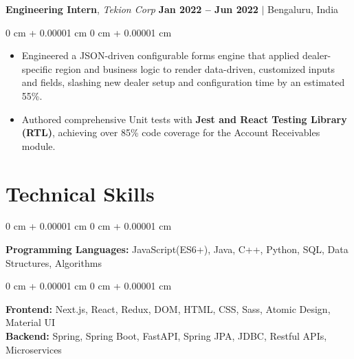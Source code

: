 \documentclass[10pt, letterpaper]{article}
\newenvironment{highlights}{
    \begin{itemize}[
        topsep=0.10 cm,     %
        parsep=0.10 cm,     %
        partopsep=0pt,      %
        itemsep=0.03cm,     %
        leftmargin=0 cm + 10pt  %
    ]
}{
    \end{itemize}
}
\newenvironment{onecolentry}{
    \begin{adjustwidth}{
        0 cm + 0.00001 cm
    }{
        0 cm + 0.00001 cm
    }
}{
    \end{adjustwidth}
}
\begin{document}
        \vspace{0.3 cm}

        \noindent
        \textbf{Engineering Intern}, {\color{darkgray}\textit{Tekion Corp}} \hfill {\color{darkgray}\small{ \textbf{Jan 2022 – Jun 2022} $|$ Bengaluru, India }}

        \vspace{0.10 cm}
        \begin{onecolentry}
            \begin{highlights}
                \item Engineered a JSON-driven configurable forms engine that applied dealer-specific region and business logic to render data-driven, customized inputs and fields, slashing new dealer setup and configuration time by an estimated 55\%.
                \item Authored comprehensive Unit tests with \textbf{Jest and React Testing Library (RTL)}, achieving over 85\% code coverage for the Account Receivables module.
            \end{highlights}
        \end{onecolentry}


    
    \section{Technical Skills}

        \begin{onecolentry}
        \textbf{Programming Languages:} JavaScript(ES6+), Java, C++, Python, SQL, Data Structures, Algorithms  %
        \end{onecolentry}
        
        \vspace{0.1 cm}
        
        \begin{onecolentry}
        \textbf{Frontend:} Next.js, React, Redux, DOM, HTML, CSS, Sass, Atomic Design, Material UI \\  %
        \vspace{0.1 cm}
        \textbf{Backend:} Spring, Spring Boot, FastAPI, Spring JPA, JDBC, Restful APIs, Microservices  %
        \end{onecolentry}
        
\end{document}
